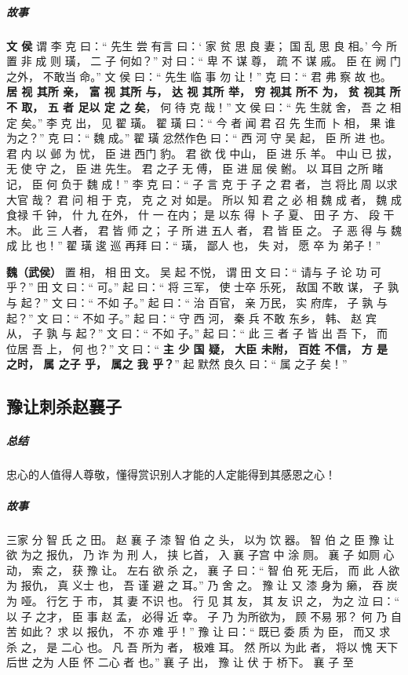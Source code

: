 \documentclass[UTF8,a4paper,8pt]{ctexbook}
\begin{document}
			
			\subparagraph{故事}
				\textbf{文 侯} 谓 李 克 曰：“ 先生 尝 有言 曰：‘ 家 贫 思 良 妻； 国 乱 思 良 相。’ 今 所 置 非 成 则 璜， 二 子 何如？” 对 曰：“ 卑 不 谋 尊， 疏 不 谋 戚。 臣 在 阙 门 之外， 不敢当 命。” 文 侯 曰：“ 先生 临 事 勿 让！” 克 曰：“ 君 弗 察 故 也。 \textbf{居 视 其所 亲， 富 视 其所 与， 达 视 其所 举， 穷 视其 所不 为， 贫 视其 所不 取， 五 者 足以 定 之 矣}， 何 待 克 哉！” 文 侯 曰：“ 先 生就 舍， 吾 之 相 定 矣。” 李 克 出， 见 翟 璜。 翟 璜 曰：“ 今 者 闻 君 召 先 生而 卜 相， 果 谁 为之？” 克 曰：“ 魏 成。” 翟 璜 忿然作色 曰：“ 西 河 守 吴 起， 臣 所 进 也。 君 内 以 邺 为 忧， 臣 进 西门 豹。 君 欲 伐 中山， 臣 进 乐 羊。 中山 已 拔， 无 使 守 之， 臣 进 先生。 君 之子 无 傅， 臣 进 屈 侯 鲋。 以 耳目 之所 睹 记， 臣 何 负于 魏 成！” 李 克 曰：“ 子 言 克 于 子 之 君 者， 岂 将比 周 以求 大官 哉？ 君 问 相 于 克， 克 之 对 如是。 所以 知 君 之 必 相 魏 成 者， 魏 成 食禄 千 钟， 什 九 在外， 什 一 在内； 是 以东 得 卜 子 夏、 田 子 方、 段 干 木。 此 三 人者， 君 皆 师 之； 子 所 进 五人 者， 君 皆 臣 之。 子 恶 得 与 魏 成 比 也！” 翟 璜 逡 巡 再拜 曰：“ 璜， 鄙人 也， 失 对， 愿 卒 为 弟子！”


				\textbf{魏（武侯）} 置 相， 相 田 文。 吴 起 不悦， 谓 田 文 曰：“ 请与 子 论 功 可 乎？” 田 文 曰：“ 可。” 起 曰：“ 将 三军， 使 士卒 乐死， 敌国 不敢 谋， 子 孰 与 起？” 文 曰：“ 不如 子。” 起 曰：“ 治 百官， 亲 万民， 实 府库， 子 孰 与 起？” 文 曰：“ 不如 子。” 起 曰：“ 守 西 河， 秦 兵 不敢 东乡， 韩、 赵 宾 从， 子 孰 与 起？” 文 曰：“ 不如 子。” 起 曰：“ 此 三 者 子 皆 出 吾 下， 而 位居 吾 上， 何 也？” 文 曰：“ \textbf{主 少 国 疑， 大臣 未附， 百姓 不信， 方 是 之时， 属 之子 乎， 属之 我 乎？}” 起 默然 良久 曰：“ 属 之子 矣！” 
		
		\subsection{豫让刺杀赵襄子}
			\subparagraph{总结}忠心的人值得人尊敬，懂得赏识别人才能的人定能得到其感恩之心！
			
			\subparagraph{故事}
				三家 分 智 氏 之 田。 赵 襄 子 漆 智 伯 之 头， 以为 饮 器。 智 伯 之 臣 豫 让 欲 为之 报仇， 乃 诈 为 刑 人， 挟 匕首， 入 襄 子宫 中 涂 厕。 襄 子 如厕 心动， 索 之， 获 豫 让。 左右 欲 杀 之， 襄 子 曰：“ 智 伯 死 无后， 而 此 人欲 为 报仇， 真 义士 也， 吾 谨 避 之 耳。” 乃 舍 之。 豫 让 又 漆 身为 癞， 吞 炭 为 哑。 行乞 于 市， 其 妻 不识 也。 行 见 其 友， 其 友 识 之， 为之 泣 曰：“ 以 子 之才， 臣 事 赵 孟， 必得 近 幸。 子 乃 为所欲为， 顾 不易 邪？ 何 乃 自 苦 如此？ 求 以 报仇， 不 亦 难 乎！” 豫 让 曰：“ 既已 委 质 为 臣， 而又 求 杀 之， 是 二心 也。 凡 吾 所为 者， 极难 耳。 然 所以 为此 者， 将以 愧 天下 后世 之为 人臣 怀 二心 者 也。” 襄 子 出， 豫 让 伏 于 桥下。 襄 子 至 
				
\end{document}
